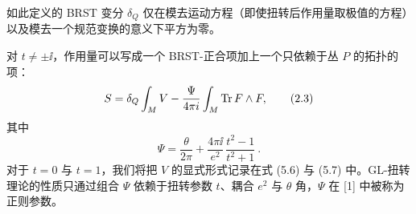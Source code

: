 
如此定义的 BRST 变分 $\delta_Q$ 仅在模去运动方程（即使扭转后作用量取极值的方程）以及模去一个规范变换的意义下平方为零。


对 $t\neq\pm\ii$，作用量可以写成一个 BRST-正合项加上一个只依赖于丛 $P$ 的拓扑的项：
\begin{equation}
S = \delta_Q\int_M V - \frac{\Psi}{4\pi i}\int_M \operatorname{Tr} F\wedge F , \tag{2.3}
\end{equation}
其中
\[ \Psi = \frac{\theta}{2\pi} + \frac{4\pi\ii}{e^2}\,\frac{t^2-1}{t^2+1} \ . \]
对于 $t=0$ 与 $t=1$，我们将把 $V$ 的显式形式记录在式 (5.6) 与 (5.7) 中。GL-扭转理论的性质只通过组合 $\Psi$ 依赖于扭转参数 $t$、耦合 $e^2$ 与 $\theta$ 角，$\Psi$ 在 [1] 中被称为正则参数。


